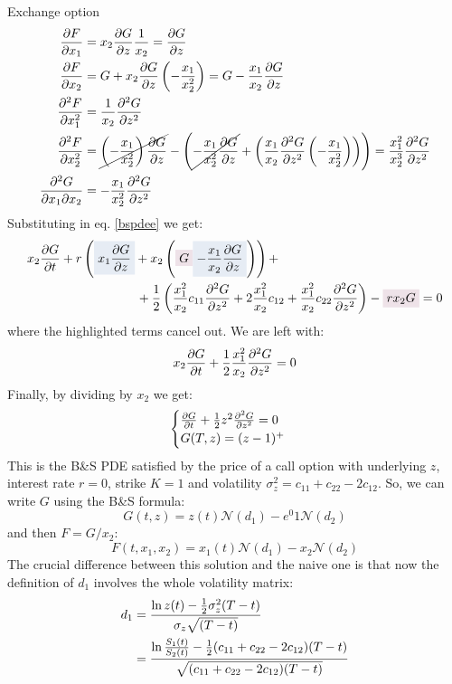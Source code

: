 \begin{example}{Exchange option}{}{}
\begin{align*}
        \pdv{F}{x_1} &= x_2\pdv{G}{z}\dfrac{1}{x_2} = \pdv{G}{z} \\
        \pdv{F}{x_2} &= G + x_2\pdv{G}{z}\left(-\dfrac{x_1}{x_2^2}\right) = G - \dfrac{x_1}{x_2}\pdv{G}{z} \\
        \pdv[2]{F}{x_1} &= \dfrac{1}{x_2}\pdv[2]{G}{z} \\
        \pdv[2]{F}{x_2} &= \cancel{\left(-\dfrac{x_1}{x_2^2 }\right)\pdv{G}{z}} - \left(\cancel{-\dfrac{x_1}{x_2^2}\pdv{G}{z}} + \left(\dfrac{x_1}{x_2} \pdv[2]{G}{z}\left(-\dfrac{x_1}{x_2^2}\right)\right)\right) = \dfrac{x_1^2}{x_2^3}\pdv[2]{G}{z} \\
        \pdv{G}{x_1}{x_2} &= -\dfrac{x_1}{x_2^2}\pdv[2]{G}{z}
    \end{align*} 
    Substituting in eq. \eqref{bspdee} we get:
    \begin{align*}
        x_2\pdv{G}{t} &+ r\left(\hlc{mylightblue}{x_1\pdv{G}{z}} + x_2\left(\hlc{mypink}{G} \hlc{mylightblue}{- \dfrac{x_1}{x_2}\pdv{G}{z}}\right)\right) + \\
        & \qquad\qquad\qquad
        + \dfrac{1}{2}\left(\dfrac{x_1^2}{x_2}c_{11}\pdv[2]{G}{z} + 2\dfrac{x_1^2}{x_2}c_{12} + \dfrac{x_1^2}{x_2}c_{22}\pdv[2]{G}{z}\right) - \hlc{mypink}{rx_2G} = 0
    \end{align*}
    where the highlighted terms cancel out. We are left with:
    \begin{equation*}
        x_2\pdv{G}{t} + \dfrac{1}{2}\dfrac{x_1^2}{x_2}\pdv[2]{G}{z}(c_{11}+c_{22}-2c_{12}) = 0
    \end{equation*}
    Finally, by dividing by $x_2$ we get:
    \begin{equation}
        \begin{cases}
        \pdv{G}{t} + \frac{1}{2}z^2\pdv[2]{G}{z}(c_{11}+c_{22}-2c_{12}) = 0 \\
        G(T,z) = (z-1)^+
        \end{cases}
    \end{equation}
    This is the B\&S PDE satisfied by the price of a call option with underlying $z$, interest rate $r=0$, strike $K=1$ and volatility $\sigma_z^2 = c_{11}+c_{22}-2c_{12}$. So, we can write $G$ using the B\&S formula:
    \begin{equation}
        G(t,z) = z(t)\mathcal{N}(d_1) - e^{0}1\mathcal{N}(d_2) 
    \end{equation}
    and then $F = G/x_2$:
    \begin{equation}
        F(t,x_1,x_2) = x_1(t)\mathcal{N}(d_1)- x_2\mathcal{N}(d_2) 
    \end{equation}
    The crucial difference between this solution and the naive one is that now the definition of $d_1$ involves the whole volatility matrix:
    \begin{align}
        \notag d_1 &= \dfrac{\ln z(t)-\frac{1}{2}\sigma_z^2(T-t)}{\sigma_z \sqrt{(T-t)}} \\
        &=
        \dfrac{\ln\frac{S_1(t)}{S_2(t)}-\frac{1}{2}(c_{11}+c_{22}-2c_{12})(T-t)}{\sqrt{(c_{11}+c_{22}-2c_{12})(T-t)}}
    \end{align}
\end{example}


